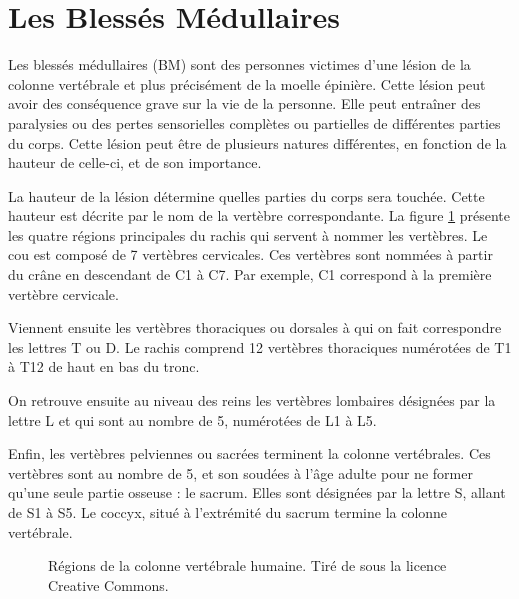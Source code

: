 \documentclass[letterpaper, twoside, 12pt, memoire, creativecommons, hyperref]{thETS}
\begin{document}
\section{Les Blessés Médullaires}

Les blessés médullaires (BM) sont des personnes victimes d'une lésion de la colonne vertébrale et plus précisément de la moelle épinière. Cette lésion peut avoir des conséquence grave sur la vie de la personne. Elle peut entraîner des paralysies ou des pertes sensorielles complètes ou partielles de différentes parties du corps. Cette lésion peut être de plusieurs natures différentes, en fonction de la hauteur de celle-ci, et de son importance. 

La hauteur de la lésion détermine quelles parties du corps sera touchée. Cette hauteur est décrite par le nom de la vertèbre correspondante. La figure \ref{fig:rachis} présente les quatre régions principales du rachis qui servent à nommer les vertèbres. Le cou est composé de 7 vertèbres cervicales. Ces vertèbres sont nommées à partir du crâne en descendant de C1 à C7. Par exemple, C1 correspond à la première vertèbre cervicale. 

Viennent ensuite les vertèbres thoraciques ou dorsales à qui on fait correspondre les lettres T ou D. Le rachis comprend 12 vertèbres thoraciques numérotées de T1 à T12 de haut en bas du tronc. 

On retrouve ensuite au niveau des reins les vertèbres lombaires désignées par la lettre L et qui sont au nombre de 5, numérotées de L1 à L5. 

Enfin, les vertèbres pelviennes ou sacrées terminent la colonne vertébrales. Ces vertèbres sont au nombre de 5, et son soudées à l'âge adulte pour ne former qu'une seule partie osseuse : le sacrum. Elles sont désignées par la lettre S, allant de S1 à S5. Le coccyx, situé à l'extrémité du sacrum termine la colonne vertébrale.

\begin{figure}
	\centering
	\caption{Régions de la colonne vertébrale humaine. Tiré de \cite{rachisWiki} sous la licence Creative Commons.}
	\label{fig:rachis}
\end{figure}
\end{document}
